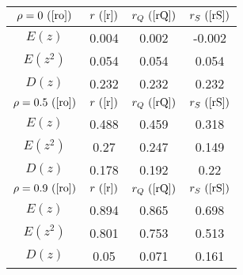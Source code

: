 \begin{tabular}{|c|c|c|c|}
\hline
$\rho = 0~(\ref{ro})$ & $r ~(\ref{r})$ & $r_Q ~(\ref{rQ})$ & $r_S ~(\ref{rS})$\\
\hline
$E(z)$ & 0.004 & 0.002 & -0.002\\
\hline
$E(z^2)$ & 0.054 & 0.054 & 0.054\\
\hline
$D(z)$ & 0.232 & 0.232 & 0.232\\
\hline
$\rho = 0.5~(\ref{ro})$ & $r ~(\ref{r})$ & $r_Q ~(\ref{rQ})$ & $r_S ~(\ref{rS})$\\
\hline
$E(z)$ & 0.488 & 0.459 & 0.318\\
\hline
$E(z^2)$ & 0.27 & 0.247 & 0.149\\
\hline
$D(z)$ & 0.178 & 0.192 & 0.22\\
\hline
$\rho = 0.9~(\ref{ro})$ & $r ~(\ref{r})$ & $r_Q ~(\ref{rQ})$ & $r_S ~(\ref{rS})$\\
\hline
$E(z)$ & 0.894 & 0.865 & 0.698\\
\hline
$E(z^2)$ & 0.801 & 0.753 & 0.513\\
\hline
$D(z)$ & 0.05 & 0.071 & 0.161\\
\hline
\end{tabular}
